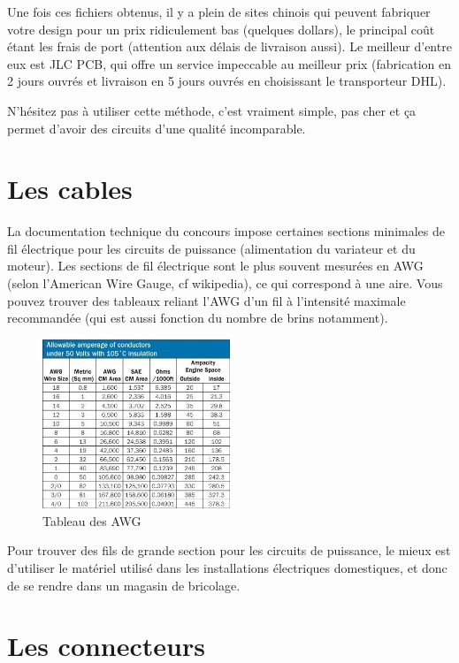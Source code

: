 \documentclass[a4paper, 11pt]{report}
\begin{document}
Une fois ces fichiers obtenus, il y a plein de sites chinois qui peuvent
fabriquer votre design pour un prix ridiculement bas (quelques dollars),
le principal coût étant les frais de port (attention aux délais de
livraison aussi). Le meilleur d'entre eux est JLC PCB, qui offre un
service impeccable au meilleur prix (fabrication en 2 jours ouvrés
et livraison en 5 jours ouvrés en choisissant le transporteur DHL).

N'hésitez pas à utiliser cette méthode, c'est vraiment simple, pas
cher et ça permet d'avoir des circuits d'une qualité incomparable.

\section{Les cables}



La documentation technique du concours impose certaines sections minimales
de fil électrique pour les circuits de puissance (alimentation du
variateur et du moteur). Les sections de fil électrique sont le plus
souvent mesurées en AWG (selon l'American Wire Gauge, cf wikipedia),
ce qui correspond à une aire. Vous pouvez trouver des tableaux reliant
l'AWG d'un fil à l'intensité maximale recommandée (qui est aussi fonction
du nombre de brins notamment).

\begin{figure}[h]
\caption{Tableau des AWG}

\centering{}\includegraphics[width=0.5\textwidth]{images/AWGchart.jpg}
\end{figure}

Pour trouver des fils de grande section pour les circuits de puissance,
le mieux est d'utiliser le matériel utilisé dans les installations
électriques domestiques, et donc de se rendre dans un magasin de bricolage.

\section{Les connecteurs}
\end{document}
